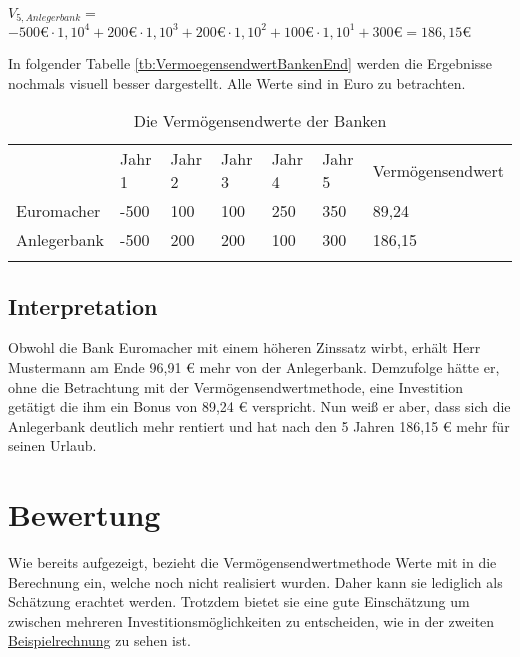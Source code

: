 \bigskip
$V_{5, Anlegerbank} =$\\
\hspace*{10mm}$-500 \text{€} \cdot 1,10^4 + 200 \text{€} \cdot 1,10^3 + 200 \text{€} \cdot 1,10^2 + 100 \text{€} \cdot 1,10^1 + 300 \text{€} = 186,15 \text{€}$

\bigskip
\bigskip
\noindent
In folgender Tabelle \eqref{tb:VermoegensendwertBankenEnd} werden die Ergebnisse nochmals visuell besser dargestellt. Alle Werte sind in Euro zu betrachten.

\bigskip

\begin{table}[!h]
    \begin{tabular}{lllllll}
        \cline{1-6} \rowcolor{gray}
                    & Jahr 1 & Jahr 2 & Jahr 3 & Jahr 4 & Jahr 5 & Vermögensendwert \\ \cline{1-7} \rowcolor{white}
        Euromacher  & -500   & 100    & 100    & 250    & 350    & 89,24            \\ \cline{1-7} \rowcolor{white}
        Anlegerbank & -500   & 200    & 200    & 100    & 300    & 186,15           \\ \cline{1-7} \rowcolor{white}
    \end{tabular}
    \caption{Die Vermögensendwerte der Banken}
    \label{tb:VermoegensendwertBankenEnd}
\end{table}

\subsection{Interpretation}

Obwohl die Bank Euromacher mit einem höheren Zinssatz wirbt, erhält Herr Mustermann am Ende 96,91 € mehr von der Anlegerbank. Demzufolge hätte er, ohne die Betrachtung mit der Vermögensendwertmethode, eine Investition getätigt die ihm ein Bonus von 89,24 € verspricht. Nun weiß er aber, dass sich die Anlegerbank deutlich mehr rentiert und hat nach den 5 Jahren 186,15 € mehr für seinen Urlaub.

\section{Bewertung}

Wie bereits aufgezeigt, bezieht die Vermögensendwertmethode Werte mit in die Berechnung ein, welche noch nicht realisiert wurden. Daher kann sie lediglich als Schätzung erachtet werden. Trotzdem bietet sie eine gute Einschätzung um zwischen mehreren Investitionsmöglichkeiten zu entscheiden, wie in der zweiten \hyperref[beispielrechnungVer]{Beispielrechnung} zu sehen ist.
